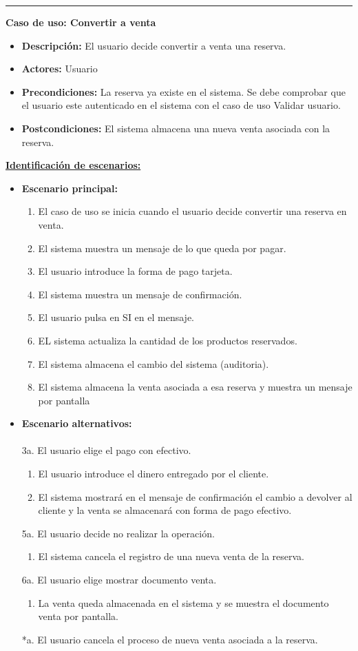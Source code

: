 \smallskip
\hrule height 1pt
\smallskip
\textbf{Caso de uso: Convertir a venta}
\begin{itemize}\renewcommand{\labelitemi}{$\cdot$}
 \item \textbf{Descripción:} El usuario decide convertir a venta una reserva.
  \item \textbf{Actores:} Usuario
  \item \textbf{Precondiciones:} La reserva ya existe en el sistema. Se debe comprobar que el usuario este autenticado en el sistema con el caso de uso Validar usuario.
  \item \textbf{Postcondiciones:} El sistema almacena una nueva venta asociada con la reserva.
\end{itemize}
\underline{\textbf{Identificación de escenarios:}}
\begin{itemize}\renewcommand{\labelitemi}{$\circ$}
 \item \textbf{Escenario principal:}
         \begin{enumerate}
          \item El caso de uso se inicia cuando el usuario decide convertir una reserva en venta.
	  \item El sistema muestra un mensaje de lo que queda por pagar.
	  \item El usuario introduce la forma de pago tarjeta.
	  \item El sistema muestra un mensaje de confirmación.
	  \item El usuario pulsa en SI en el mensaje.
	  \item EL sistema actualiza la cantidad de los productos reservados.
	  \item El sistema almacena el cambio del sistema (auditoria).
	  \item El sistema almacena la venta asociada a esa reserva y muestra un mensaje por pantalla
         \end{enumerate}
\item \textbf{Escenario alternativos:}\\\\
	3a. El usuario elige el pago con efectivo.
		\begin{enumerate}
		\item El usuario introduce el dinero entregado por el cliente.
		 \item El sistema mostrará en el mensaje de confirmación el cambio a devolver al cliente y la venta se almacenará con forma de pago efectivo.
		\end{enumerate}
	 5a. El usuario decide no realizar la operación.
	      \begin{enumerate}
	       \item El sistema cancela el registro de una nueva venta de la reserva.
	      \end{enumerate}
         6a. El usuario elige mostrar documento venta.
	      \begin{enumerate}
	       \item La venta queda almacenada en el sistema y se muestra el documento venta por pantalla.
	      \end{enumerate}
          *a. El usuario cancela el proceso de nueva venta asociada a la reserva.
\end{itemize}

